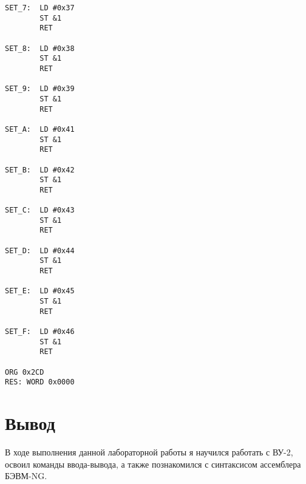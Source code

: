 \begin{lstlisting}
SET_7:  LD #0x37
        ST &1
        RET
        
SET_8:  LD #0x38
        ST &1
        RET
        
SET_9:  LD #0x39
        ST &1
        RET
        
SET_A:  LD #0x41
        ST &1
        RET
        
SET_B:  LD #0x42
        ST &1
        RET
        
SET_C:  LD #0x43
        ST &1
        RET
        
SET_D:  LD #0x44
        ST &1
        RET
        
SET_E:  LD #0x45
        ST &1
        RET
        
SET_F:  LD #0x46
        ST &1
        RET
          
ORG 0x2CD
RES: WORD 0x0000
\end{lstlisting}
\section{Вывод}
В ходе выполнения данной лабораторной работы я научился работать с ВУ-2, освоил команды ввода-вывода, а также познакомился с синтаксисом ассемблера БЭВМ-NG.
